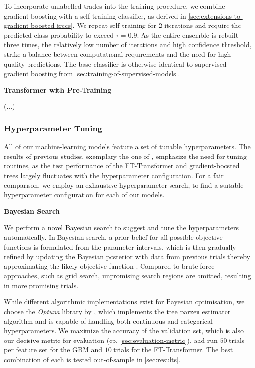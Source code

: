 To incorporate unlabelled trades into the training procedure, we combine gradient boosting with a self-training classifier, as derived in \cref{sec:extensions-to-gradient-boosted-trees}. We repeat self-training for 2 iterations and require the predicted class probability to exceed $\tau=0.9$. As the entire ensemble is rebuilt three times, the relatively low number of iterations and high confidence threshold, strike a balance between computational requirements and the need for high-quality predictions. The base classifier is otherwise identical to supervised gradient boosting from \cref{sec:training-of-supervised-models}.

\textbf{Transformer with Pre-Training}

(...)

\subsubsection{Hyperparameter Tuning}\label{sec:hyperparameter-tuning}

All of our machine-learning models feature a set of tunable hyperparameters. The results of previous studies, exemplary the one of \textcite[][5]{grinsztajnWhyTreebasedModels2022}, emphasize the need for tuning routines, as the test performance of the FT-Transformer and gradient-boosted trees largely fluctuates with the hyperparameter configuration. For a fair comparison, we employ an exhaustive hyperparameter search, to find a suitable hyperparameter configuration for each of our models.

\textbf{Bayesian Search}

We perform a novel Bayesian search to suggest and tune the hyperparameters automatically. In Bayesian search, a prior belief for all possible objective functions is formulated from the parameter intervals, which is then gradually refined by updating the Bayesian posterior with data from previous trials thereby approximating the likely objective function \autocite[][2]{shahriariTakingHumanOut2016}. Compared to brute-force approaches, such as grid search, unpromising search regions are omitted, resulting in more promising trials.

While different algorithmic implementations exist for Bayesian optimisation, we choose the \emph{Optuna} library by \textcite[][1--10]{akibaOptunaNextgenerationHyperparameter2019}, which implements the tree parzen estimator algorithm and is capable of handling both continuous and categorical hyperparameters. We maximize the accuracy of the validation set, which is also our decisive metric for evaluation (cp. \cref{sec:evaluation-metric}), and run $\num{50}$ trials per feature set for the \gls{GBM} and $\num{10}$ trials for the FT-Transformer. The best combination of each is tested out-of-sample in \cref{sec:results}.

